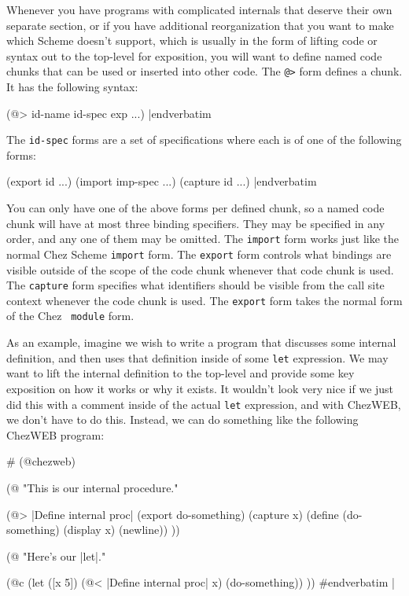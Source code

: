 Whenever you have programs with complicated internals that deserve
their own separate section, or if you have additional reorganization
that you want to make which Scheme doesn't support, which is usually
in the form of lifting code or syntax out to the top-level for
exposition, you will want to define named code chunks that can be used
or inserted into other code.  The {\tt @>} form defines a chunk.  It
has the following syntax:

\medskip\verbatim
(@> id-name id-spec exp ...)
|endverbatim
\medskip

\noindent
The {\tt id-spec} forms are a set of specifications where each is of
one of the following forms:

\medskip\verbatim
(export id ...)
(import imp-spec ...)
(capture id ...)
|endverbatim

\noindent You can only have one of the above forms per defined chunk,
so a named code chunk will have at most three binding specifiers.
They may be specified in any order, and any one of them may be
omitted.  The {\tt import} form works just like the normal Chez Scheme
{\tt import} form.  The {\tt export} form controls what bindings are
visible outside of the scope of the code chunk whenever that code
chunk is used.  The {\tt capture} form specifies what identifiers
should be visible from the call site context whenever the code chunk
is used.  The {\tt export} form takes the normal form of the Chez {\tt
module} form.

As an example, imagine we wish to write a program that
discusses some internal definition, and then uses that definition
inside of some {\tt let} expression.  We may want to lift the internal
definition to the top-level and provide some key exposition on how it
works or why it exists.  It wouldn't look very nice if we just did
this with a comment inside of the actual {\tt let} expression, and
with ChezWEB, we don't have to do this.  Instead, we can do something
like the following ChezWEB program:

\verbatimescapechar \#
\medskip\verbatim
(@chezweb)

(@ "This is our internal procedure."

(@> |Define internal proc|
(export do-something)
(capture x)
(define (do-something)
  (display x)
  (newline))
))

(@ "Here's our |let|."

(@c
(let ([x 5])
  (@< |Define internal proc| x)
  (do-something))
))
#endverbatim
\medskip\verbatimescapechar |


